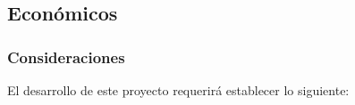 

\subsection{Econ\'omicos}
\subsubsection{Consideraciones}
El desarrollo de este proyecto requerir\'a establecer lo siguiente:



